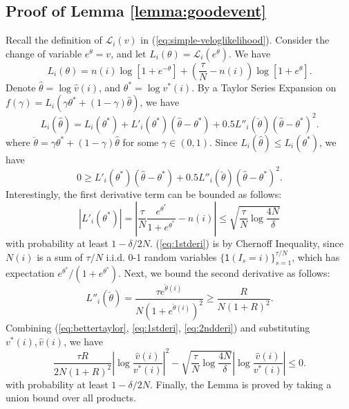 \documentclass{article}
\theoremstyle{definition}
\begin{document}
\subsection{Proof of Lemma \ref{lemma:goodevent}}
Recall the definition of $\mathcal{L}_i(v)$ in (\ref{eq:simple-veloglikelihood}). Consider the change of variable $e^{\theta} = v$, and let $L_i(\theta) = \mathcal{L}_i(e^\theta)$. We have 
\begin{equation*}
L_i(\theta) = n(i)\log\left[1+e^{-\theta}\right] + \left(\frac{\tau}{N} - n(i)\right)\log\left[1 + e^\theta\right].
\end{equation*}
Denote $\hat{\theta} = \log \hat{v}(i)$, and $\theta^* = \log v^*(i)$.  By a Taylor Series Expansion on $f(\gamma) = L_i(\gamma \theta^* + (1-\gamma)\hat{\theta})$, we have
\begin{equation*}
L_i(\hat{\theta}) = L_i(\theta^*) + L'_i(\theta^*) (\hat{\theta} - \theta^*) + 0.5 L''_i(\breve{\theta})(\hat{\theta} - \theta^*)^2.
\end{equation*}
where $\breve{\theta} = \gamma\theta^* + (1-\gamma)\hat{\theta}$ for some $\gamma \in (0, 1)$. Since $L_i(\hat{\theta}) \leq L_i(\theta^*)$,  we have
\begin{equation}\label{eq:bettertaylor}
0\geq L'_i(\theta^*) (\hat{\theta} - \theta^*) + 0.5 L''_i(\breve{\theta})(\hat{\theta} - \theta^*)^2.
\end{equation}
Interestingly, the first derivative term can be bounded as follows:
\begin{equation}\label{eq:1stderi}
\left|L'_i(\theta^*)\right| = \left|\frac{\tau}{N}\frac{e^{\theta^*}}{1 + e^{\theta^*}} - n(i)\right| \leq \sqrt{\frac{\tau}{N}\log\frac{4N}{\delta}}
\end{equation}
with probability at least $1 - \delta/2N$. (\ref{eq:1stderi}) is by Chernoff Inequality, since $N(i)$ is a sum of $\tau/N$ i.i.d. 0-1 random variables $\{\mathsf{1}(I_s = i)\}^{\tau/N}_{s=1}$, which has expectation $e^{\theta^*}/(1 + e^{\theta^*})$. Next, we bound the second derivative as follows:
\begin{equation}\label{eq:2ndderi}
L''_i(\breve{\theta}) = \frac{\tau e^{\breve{\theta}(i)}}{N(1 + e^{\breve{\theta}(i)})^2}\geq \frac{R}{N (1 + R)^2}.
\end{equation}
Combining (\ref{eq:bettertaylor}, \ref{eq:1stderi}, \ref{eq:2ndderi}) and substituting $v^*(i), \hat{v}(i)$, we have
\begin{equation*}
\frac{\tau R}{2N(1 + R)^2}\left|\log\frac{\hat{v}(i)}{v^*(i)}\right|^2 - \sqrt{\frac{\tau}{N}\log\frac{4N}{\delta}}\left|\log\frac{\hat{v}(i)}{v^*(i)}\right| \leq 0.
\end{equation*}
with probability at least $1 - \delta/2N$. Finally, the Lemma is proved by taking a union bound over all products.
\end{document}
